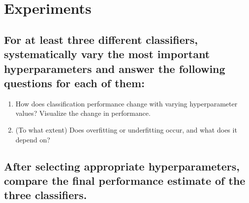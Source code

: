 
\section{Experiments}
\label{sec:Experiments}






\subsection{For at least three different classifiers, systematically vary the most important hyperparameters and answer the following questions for each of them: }
\label{sec:Experiments:a}

\begin{enumerate}[label=\roman*.)]
\item How does classification performance change with varying hyperparameter values? Visualize the
change in performance.

\item (To what extent) Does overfitting or underfitting occur, and what does it depend on?
\end{enumerate}


\subsection{After selecting appropriate hyperparameters, compare the final performance estimate of the three classifiers. }
\label{sec:Experiments:b}



